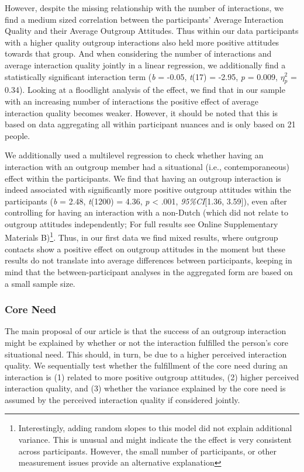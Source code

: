 \documentclass[man, 12pt, a4paper]{apa7}
\theoremstyle{break}
\theoremstyle{plain}
\begin{document}
However, despite the missing relationship with the number of
interactions, we find a medium sized correlation between the
participants' Average Interaction Quality and their Average Outgroup
Attitudes. Thus within our data participants with a higher quality
outgroup interactions also held more positive attitudes towards that
group. And when considering the number of interactions and average
interaction quality jointly in a linear regression, we additionally find
a statistically significant interaction term (\textit{b} = -0.05,
\textit{t}(17) = -2.95, \textit{p} = 0.009, \(\eta_p^2\) = 0.34).
Looking at a floodlight analysis of the effect, we find that in our
sample with an increasing number of interactions the positive effect of
average interaction quality becomes weaker. However, it should be noted
that this is based on data aggregating all within participant nuances
and is only based on 21 people.

We additionally used a multilevel regression to check whether having an
interaction with an outgroup member had a situational (i.e.,
contemporaneous) effect within the participants. We find that having an
outgroup interaction is indeed associated with significantly more
positive outgroup attitudes within the participants (\textit{b} = 2.48,
\textit{t}(1200) = 4.36, \textit{p} \textless{} .001,
\textit{95\%CI}{[}1.36, 3.59{]}), even after controlling for having an
interaction with a non-Dutch (which did not relate to outgroup attitudes
independently; For full results see Online Supplementary Materials
B)\footnote{Interestingly, adding random slopes to this model did not explain additional variance. This is unusual and might indicate the the effect is very consistent across participants. However, the small number of participants, or other measurement issues provide an alternative explanation}.
Thus, in our first data we find mixed results, where outgroup contacts
show a positive effect on outgroup attitudes in the moment but these
results do not translate into average differences between participants,
keeping in mind that the between-participant analyses in the aggregated
form are based on a small sample size.

\subsubsection{Core Need}

The main proposal of our article is that the success of an outgroup
interaction might be explained by whether or not the interaction
fulfilled the person's core situational need. This should, in turn, be
due to a higher perceived interaction quality. We sequentially test
whether the fulfillment of the core need during an interaction is (1)
related to more positive outgroup attitudes, (2) higher perceived
interaction quality, and (3) whether the variance explained by the core
need is assumed by the perceived interaction quality if considered
jointly.
\end{document}
